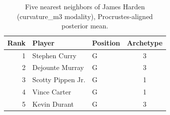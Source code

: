 \begin{table}[htbp]
  \centering\small
  \begin{tabular}{rllc}
    \toprule
    Rank & Player & Position & Archetype \\
    \midrule
    1 & Stephen Curry & G & 3 \\
    2 & Dejounte Murray & G & 3 \\
    3 & Scotty Pippen Jr. & G & 1 \\
    4 & Vince Carter & G & 1 \\
    5 & Kevin Durant & G & 3 \\
    \bottomrule
  \end{tabular}
  \caption{Five nearest neighbors of James Harden (curvature_m3 modality), Procrustes-aligned posterior mean.}
  \label{tab:James_Harden_neighbors_curvature_m3}
\end{table}


